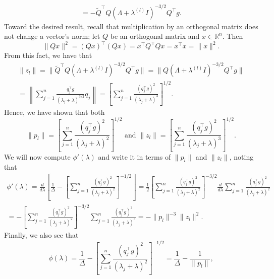 \documentclass{../kin_math}
\begin{document}
\begin{questions}
\begin{solution}
\begin{multline*}
      = -\tilde{Q}^\top Q (\Lambda + \lambda^{(l)} I)^{-3 / 2} Q^\top g.
    \end{multline*}
    Toward the desired result, recall that multiplication by an orthogonal matrix does not change a vector's norm; let $Q$ be an orthogonal matrix and $x \in \mathbb{R}^n$. Then
    \begin{equation*}
    \lVert Qx \rVert^2 = (Qx)^\top (Qx) = x^\top Q^\top Q x = x^\top x = \lVert x \rVert^2.
    \end{equation*}
    From this fact, we have that
    \begin{multline*}
      \lVert z_l \rVert = \lVert \tilde{Q}^\top Q (\Lambda + \lambda^{(l)} I)^{-3 / 2} Q^\top g \rVert = \lVert Q (\Lambda + \lambda^{(l)} I)^{-3 / 2} Q^\top g \rVert \\
      = \left\lVert \sum_{j = 1}^n \frac{q_j^\top g}{(\lambda_j + \lambda)^{3 / 2}} q_j \right\rVert = \left[\sum_{j = 1}^n \frac{(q_j^\top g)^2}{(\lambda_j + \lambda)^3}\right]^{1 / 2}.
    \end{multline*}
    Hence, we have shown that both
    \begin{equation*}
      \lVert p_l \rVert = \left[\sum_{j = 1}^n \frac{(q_j^\top g)^2}{(\lambda_j + \lambda)^2}\right]^{1 / 2} \text{ and } \lVert z_l \rVert = \left[\sum_{j = 1}^n \frac{(q_j^\top g)^2}{(\lambda_j + \lambda)^3}\right]^{1 / 2}.
    \end{equation*}
    We will now compute $\phi'(\lambda)$ and write it in terms of $\lVert p_l \rVert$ and $\lVert z_l \rVert$, noting that
    \begin{multline*}
      \phi'(\lambda) = \frac{d}{d\lambda} \left[\frac{1}{\Delta} - \left[\sum_{j = 1}^n \frac{(q_j^\top g)^2}{(\lambda_j + \lambda)^2}\right]^{-1 / 2} \right] = \frac{1}{2} \left[\sum_{j = 1}^n \frac{(q_j^\top g)^2}{(\lambda_j + \lambda)^2}\right]^{-3 / 2} \frac{d}{d\lambda} \sum_{j = 1}^n \frac{(q_j^\top g)^2}{(\lambda_j + \lambda)^2} \\
      = -\left[\sum_{j = 1}^n \frac{(q_j^\top g)^2}{(\lambda_j + \lambda)^2}\right]^{-3 / 2} \sum_{j = 1}^n \frac{(q_j^\top g)^2}{(\lambda_j + \lambda)^3} = - \lVert p_l \rVert^{-3} \lVert z_l \rVert^2.
    \end{multline*}
    Finally, we also see that
    \begin{equation*}
      \phi(\lambda) = \frac{1}{\Delta} - \left[\sum_{j = 1}^n \frac{(q_j^\top g)^2}{(\lambda_j + \lambda)^2}\right]^{-1 / 2} = \frac{1}{\Delta} - \frac{1}{\lVert p_l \rVert},
    \end{equation*}

\end{solution}
\end{questions}
\end{document}
